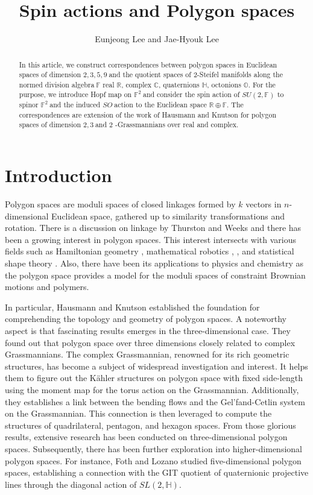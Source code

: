 \documentclass[a4paper]{article}%
\begin{document}
\title{Spin actions and Polygon spaces}
\author{Eunjeong Lee and Jae-Hyouk Lee}
\maketitle

\begin{abstract}
In this article, we construct correspondences between polygon spaces in
Euclidean spaces of dimension $2,3,5,9\ $and the quotient spaces of
$2$-Steifel manifolds along the normed division algebra$\ \mathbb{F}$ real
$\mathbb{R}$, complex $\mathbb{C}$, quaternions $\mathbb{H}$, octonions
$\mathbb{O}$. For the purpose, we introduce Hopf map on $\mathbb{F}^{2}\ $and
consider the spin action of $SU\left(  2,\mathbb{F}\right)  $ to spinor
$\mathbb{F}^{2}\ $and the induced $SO\ $action to the Euclidean space
$\mathbb{R\oplus F}$. The correspondences are extension of the work of
Hausmann and Knutson for polygon spaces of dimension $2,3\ $and $2$%
-Grassmannians over real and complex.

\end{abstract}

\section{Introduction}

Polygon spaces are moduli spaces of closed linkages formed by $k$ vectors in
$n$-dimensional Euclidean space, gathered up to similarity transformations and
rotation. There is a discussion on linkage by Thurston and Weeks \cite{TW} and
there has been a growing interest in polygon spaces. This interest intersects
with various fields such as Hamiltonian geometry \cite{HK}, \cite{KM}
mathematical robotics \cite{Fa}, \cite{MT}, and statistical shape theory
\cite{HR}. Also, there have been its applications to physics and chemistry as
the polygon space provides a model for the moduli spaces of constraint
Brownian motions and polymers.

In particular, Hausmann and Knutson \cite{HK} established the foundation for
comprehending the topology and geometry of polygon spaces. A noteworthy aspect
is that fascinating results emerges in the three-dimensional case. They found
out that polygon space over three dimensions closely related to complex
Grassmannians. The complex Grassmannian, renowned for its rich geometric
structures, has become a subject of widespread investigation and interest. It
helps them to figure out the K\"{a}hler structures on polygon space with fixed
side-length using the moment map for the torus action on the Grassmannian.
Additionally, they establishes a link between the bending flows and the
Gel'fand-Cetlin system on the Grassmannian. This connection is then leveraged
to compute the structures of quadrilateral, pentagon, and hexagon spaces. From
those glorious results, extensive research has been conducted on
three-dimensional polygon spaces. Subsequently, there has been further
exploration into higher-dimensional polygon spaces. For instance, Foth and
Lozano \cite{FL} studied five-dimensional polygon spaces, establishing a
connection with the GIT quotient of quaternionic projective lines through the
diagonal action of $SL(2,\mathbb{H})$.
\end{document}
